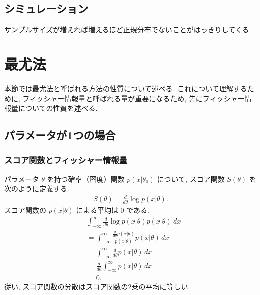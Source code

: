 \documentclass[a4paper, 12pt]{jarticle}
\begin{document}
\subsection{シミュレーション}

サンプルサイズが増えれば増えるほど正規分布でないことがはっきりしてくる.

\section{最尤法}
本節では最尤法と呼ばれる方法の性質について述べる. これについて理解するために, フィッシャー情報量と呼ばれる量が重要になるため, 先にフィッシャー情報量についての性質を述べる. 

\subsection{パラメータが1つの場合}

\subsubsection{スコア関数とフィッシャー情報量}
パラメータ $\theta$ を持つ確率（密度）関数 $p(x|\theta_0)$ について, スコア関数 $S(\theta)$ を次のように定義する. 
\begin{align}
S(\theta) = \frac{d}{d\theta}\log p(x | \theta). 
\end{align}
スコア関数の $p(x|\theta)$ による平均は 0 である.  
\begin{align}
&\int_{-\infty}^{\infty} \frac{d}{d\theta}\log p(x | \theta) p(x|\theta)\, dx \\
&= \int_{-\infty}^{\infty} \frac{\frac{d}{d\theta}p(x | \theta)}{p(x | \theta)} p(x|\theta) \, dx \\
&=\int_{-\infty}^{\infty} \frac{d}{d\theta}p(x | \theta)\, dx \\
&=  \frac{d}{d\theta} \int_{-\infty}^{\infty} p(x | \theta)\, dx\\
&= 0.
\end{align}
従い, スコア関数の分散はスコア関数の2乗の平均に等しい.
\end{document}
